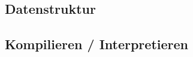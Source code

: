 

\subsection{Datenstruktur}
\label{sec:requirements:program:structure}


\subsection{Kompilieren / Interpretieren}
\label{sec:requirements:world:compile-interpret}



